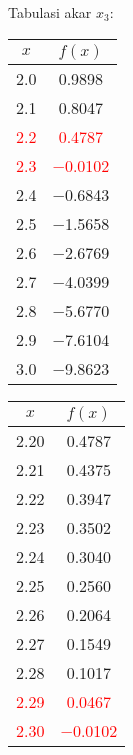 \documentclass{article}
\begin{document}
\begin{enumerate}
\begin{enumerate}
        Tabulasi akar $x_3$: \\
        \begin{tabular}{|c|c|}
            \hline
            $x$   & $f(x)$ \\
            \hline
            \num{2,0} & \num{0,9898} \\
            \num{2,1} & \num{0,8047} \\
            \textcolor{red}{\num{2,2}} & \textcolor{red}{\num{0,4787}} \\
            \textcolor{red}{\num{2,3}} & \textcolor{red}{\num{-0,0102}} \\
            \num{2,4} & \num{-0,6843} \\
            \num{2,5} & \num{-1,5658} \\
            \num{2,6} & \num{-2,6769} \\
            \num{2,7} & \num{-4,0399} \\
            \num{2,8} & \num{-5,6770} \\
            \num{2,9} & \num{-7,6104} \\
            \num{3,0} & \num{-9,8623} \\
            \hline
            \end{tabular}\quad
            \begin{tabular}{|c|c|}
            \hline
            $x$   & $f(x)$ \\
            \hline
            \num{2,20} & \num{0,4787} \\
            \num{2,21} & \num{0,4375} \\
            \num{2,22} & \num{0,3947} \\
            \num{2,23} & \num{0,3502} \\
            \num{2,24} & \num{0,3040} \\
            \num{2,25} & \num{0,2560} \\
            \num{2,26} & \num{0,2064} \\
            \num{2,27} & \num{0,1549} \\
            \num{2,28} & \num{0,1017} \\
            \textcolor{red}{\num{2,29}} & \textcolor{red}{\num{0,0467}} \\
            \textcolor{red}{\num{2,30}} & \textcolor{red}{\num{-0,0102}} \\
            \hline
            \end{tabular}\quad
            \begin{tabular}{|c|c|}

\end{tabular}
\end{enumerate}
\end{enumerate}
\end{document}
